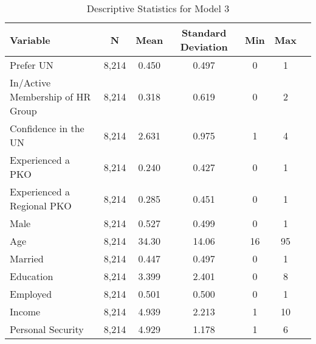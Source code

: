 \begin{table}[h!]\centering
\caption{Descriptive Statistics for Model 3}
\begin{tabular}{l*{6}{c}}
\hline\hline
Variable & N & Mean & Standard Deviation & Min & Max \\ \hline
Prefer UN & 8,214 & 0.450 & 0.497 & 0 & 1 \\
In/Active Membership of HR Group & 8,214 & 0.318 & 0.619 & 0 & 2 \\
Confidence in the UN & 8,214 & 2.631 & 0.975 & 1 & 4 \\
Experienced a PKO & 8,214 & 0.240 & 0.427 & 0 & 1 \\
Experienced a Regional PKO & 8,214 & 0.285 & 0.451 & 0 & 1 \\
Male & 8,214 & 0.527 & 0.499 & 0 & 1 \\
Age & 8,214 & 34.30 & 14.06 & 16 & 95 \\
Married & 8,214 & 0.447 & 0.497 & 0 & 1 \\
Education & 8,214 & 3.399 & 2.401 & 0 & 8 \\
Employed & 8,214 & 0.501 & 0.500 & 0 & 1 \\
Income & 8,214 & 4.939 & 2.213 & 1 & 10 \\
Personal Security & 8,214 & 4.929 & 1.178 & 1 & 6 \\
\hline
\end{tabular}
\end{table}
